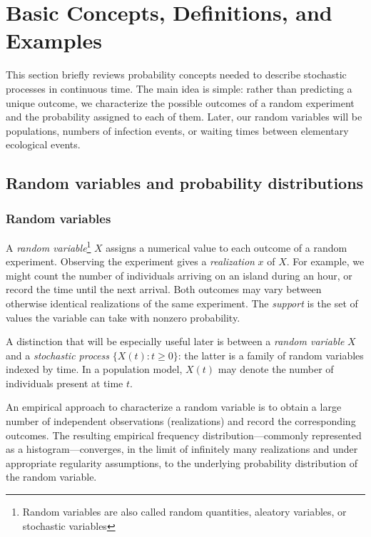 \section{Basic Concepts, Definitions, and Examples}
\label{sec:basic_concepts}

This section briefly reviews probability concepts needed to describe stochastic processes in continuous time. The main idea is simple: rather than predicting a unique outcome, we characterize the possible outcomes of a random experiment and the probability assigned to each of them. Later, our random variables will be populations, numbers of infection events, or waiting times between elementary ecological events.

\subsection{Random variables and probability distributions}

\subsubsection{Random variables}
A \emph{random variable}\footnote{Random variables are also called random quantities, aleatory variables, or stochastic variables} $X$ assigns a numerical value to each outcome of a random experiment. Observing the experiment gives a \emph{realization} $x$ of $X$. For example, we might count the number of individuals arriving on an island during an hour, or record the time until the next arrival. Both outcomes may vary between otherwise identical realizations of the same experiment. The \emph{support} is the set of values the variable can take with nonzero probability.

A distinction that will be especially useful later is between a \emph{random variable} $X$ and a \emph{stochastic process} $\{X(t):t\geq 0\}$: the latter is a family of random variables indexed by time. In a population model, $X(t)$ may denote the number of individuals present at time $t$.

An empirical approach to characterize a random variable is to obtain a large number of independent observations (realizations) and record the corresponding outcomes. The resulting empirical frequency distribution---commonly represented as a histogram---converges, in the limit of infinitely many realizations and under appropriate regularity assumptions, to the underlying probability distribution of the random variable.

